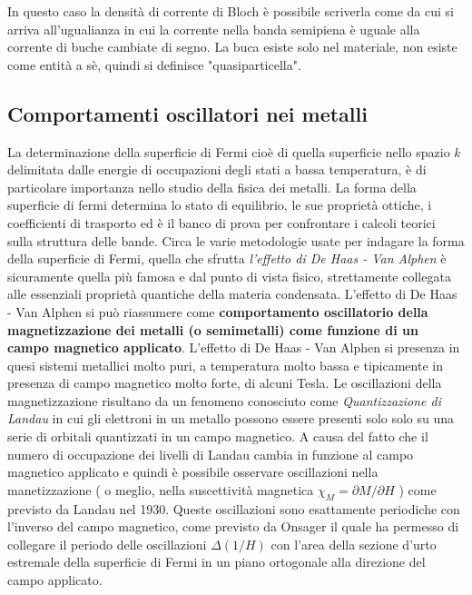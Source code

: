 In questo caso la densità di corrente di Bloch è possibile scriverla come 
da cui si arriva all'ugualianza
in cui la corrente nella banda semipiena è uguale alla corrente di buche cambiate di segno. La buca esiste solo nel materiale, non esiste come entit\`a a s\`e, quindi si definisce "quasiparticella". 
\subsection{Comportamenti oscillatori nei metalli}
La determinazione della superficie di Fermi cio\`e di quella superficie nello spazio $k$ delimitata dalle energie di occupazioni degli stati a bassa temperatura, \`e di particolare importanza nello studio della fisica dei metalli. La forma della superficie di fermi determina lo stato di equilibrio, le sue propriet\`a ottiche, i coefficienti di trasporto ed \`e il banco di prova per confrontare i calcoli teorici sulla struttura delle bande.
Circa le varie metodologie usate per indagare la forma della superficie di Fermi, quella che sfrutta \textit{l'effetto di De Haas - Van Alphen} \`e sicuramente quella pi\`u famosa e dal punto di vista fisico, strettamente collegata alle essenziali propriet\`a quantiche della materia condensata. L'effetto di De Haas - Van Alphen si pu\`o riassumere come \textbf{comportamento oscillatorio della magnetizzazione dei metalli (o semimetalli) come funzione di un campo magnetico applicato}.
L'effetto di De Haas - Van Alphen si presenza in quesi sistemi metallici molto puri, a temperatura molto bassa e tipicamente in presenza di campo magnetico molto forte, di alcuni Tesla. Le oscillazioni della magnetizzazione risultano da un fenomeno conosciuto come \textit{Quantizzazione di Landau} in cui gli elettroni in un metallo possono essere presenti solo solo su una serie di orbitali quantizzati in un campo magnetico. A causa del fatto che il numero di occupazione dei livelli di Landau cambia in funzione al campo magnetico applicato e quindi \`e possibile osservare oscillazioni nella manetizzazione ( o meglio, nella suscettivit\`a magnetica $\chi_M = \partial M / \partial H$ ) come previsto da Landau nel 1930. Queste oscillazioni sono esattamente periodiche con l'inverso del campo magnetico, come previsto da Onsager il quale ha permesso di collegare il periodo delle oscillazioni $\Delta(1/H)$ con l'area della sezione d'urto estremale della superficie di Fermi in un piano ortogonale alla direzione del campo applicato.

